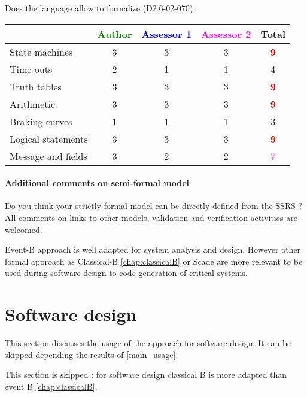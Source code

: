 Does the language allow to  formalize (D2.6-02-070):

\begin{tabular}{|l | c | c | c | c|}
\hline
& \textcolor{green}{Author} & \textcolor{blue}{Assessor 1} & \textcolor{magenta}{Assessor 2} & Total \\
\hline 
State machines  & 3    & 3    & 3    & \textcolor{red}{\textbf{9}} \\
\hline
Time-outs  & 2    & 1    & 1    & 4    \\
\hline
Truth tables  & 3    & 3    & 3    & \textcolor{red}{\textbf{9}} \\
\hline
Arithmetic  & 3    & 3    & 3    & \textcolor{red}{\textbf{9}} \\
\hline
Braking curves  & 1    & 1    & 1    & 3    \\
\hline
Logical statements & 3    & 3    & 3    & \textcolor{red}{\textbf{9}} \\
\hline
Message and fields & 3    & 2    & 2    & \textcolor{magenta}{7}  \\
\hline
\end{tabular}

\paragraph{Additional comments on semi-formal  model} Do you think your strictly formal  model can be directly defined from the SSRS ?
All comments on links to  other models, validation and verification activities are welcomed.


\begin{author_comment}
Event-B  approach is well adapted for system analysis and design. However other formal approach as Classical-B \ref{chap:classicalB} or Scade are more relevant to be used during software design to code generation of critical systems.
\end{author_comment}


\section{Software design}
This section discusses the usage of the approach for software design.
It can be skipped depending the results of \ref{main_usage}.


\begin{author_comment}
This section is skipped :  for software design classical B is more adapted than event B \ref{chap:classicalB}.
\end{author_comment}



